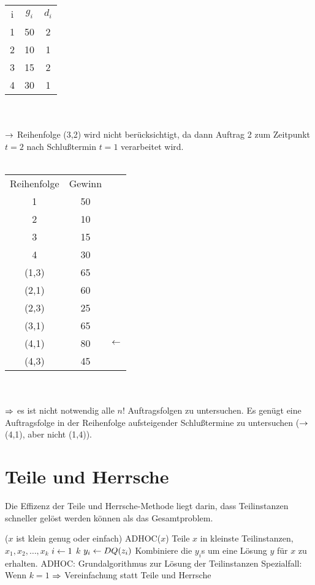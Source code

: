 \documentclass[a4paper,twoside,DIV15,BCOR12mm]{scrbook}
\begin{document}
\begin{tabular}{ccc}
i	& $g_i$	& $d_i$ \\
1	& 50	& 2 \\
2	& 10	& 1 \\
3	& 15	& 2 \\
4	& 30	& 1 \\
\end{tabular} \\
\\
$\rightarrow$ Reihenfolge (3,2) wird nicht berücksichtigt, da dann Auftrag 2 zum Zeitpunkt $t=2$ nach Schlußtermin $t=1$ verarbeitet wird. \\
\\
\begin{tabular}{ccl}
Reihenfolge & Gewinn \\
1		& 50 \\
2		& 10 \\
3		& 15 \\
4		& 30 \\
(1,3)	& 65 \\
(2,1)	& 60 \\
(2,3)	& 25 \\
(3,1)	& 65 \\
(4,1)	& 80 & $\leftarrow$\\
(4,3)	& 45 \\
\end{tabular} \\
\\
$\Rightarrow$ es ist nicht notwendig alle $n!$ Auftragsfolgen zu untersuchen. Es genügt eine Auftragsfolge in der Reihenfolge aufsteigender Schlußtermine zu untersuchen ($\rightarrow$ (4,1), aber nicht (1,4)).


\section{Teile und Herrsche}

Die Effizenz der Teile und Herrsche-Methode liegt darin, dass Teilinstanzen schneller gelöst werden
können als das Gesamtproblem.

\begin{codebox}
\li	\If ($x$ ist klein genug oder einfach)
\li		\Then \Return ADHOC($x$)
		\End
\li Teile $x$ in kleinste Teilinstanzen, $x_1, x_2, \ldots, x_k$
\li \For $i \leftarrow 1$ \To $k$
\li		\Do
					$y_i \leftarrow DQ(z_i)$
		\End
\li Kombiniere die $y_i$s um eine Lösung $y$ für $x$ zu erhalten.
\zi	ADHOC: Grundalgorithmus zur Lösung der Teilinstanzen
\zi	Spezialfall: Wenn $k=1$ $\Rightarrow$ Vereinfachung statt Teile und Herrsche
\end{codebox}
\end{document}

